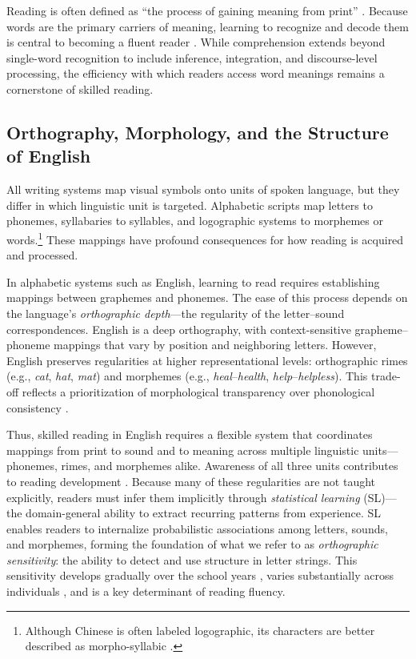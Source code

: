 \documentclass[preprint,12pt, authoryear, review]{elsarticle}
\begin{document}
Reading is often defined as “the process of gaining meaning from print” \citep[][p.~34]{raynerHowPsychologicalScience2001}. Because words are the primary carriers of meaning, learning to recognize and decode them is central to becoming a fluent reader \citep[e.g.,][]{castlesEndingReadingWars2018}. While comprehension extends beyond single-word recognition to include inference, integration, and discourse-level processing, the efficiency with which readers access word meanings remains a cornerstone of skilled reading.

\subsection{Orthography, Morphology, and the Structure of English}

All writing systems map visual symbols onto units of spoken language, but they differ in which linguistic unit is targeted. Alphabetic scripts map letters to phonemes, syllabaries to syllables, and logographic systems to morphemes or words.\footnote{Although Chinese is often labeled logographic, its characters are better described as morpho-syllabic \citep{raynerHowPsychologicalScience2001}.} These mappings have profound consequences for how reading is acquired and processed. 

In alphabetic systems such as English, learning to read requires establishing mappings between graphemes and phonemes. The ease of this process depends on the language’s \textit{orthographic depth}—the regularity of the letter–sound correspondences. English is a deep orthography, with context-sensitive grapheme–phoneme mappings that vary by position and neighboring letters. However, English preserves regularities at higher representational levels: orthographic rimes (e.g., \textit{cat}, \textit{hat}, \textit{mat}) and morphemes (e.g., \textit{heal}–\textit{health}, \textit{help}–\textit{helpless}). This trade-off reflects a prioritization of morphological transparency over phonological consistency \citep{zieglerReadingAcquisitionDevelopmental2005, rastlePlaceMorphologyLearning2019}. 

Thus, skilled reading in English requires a flexible system that coordinates mappings from print to sound and to meaning across multiple linguistic units—phonemes, rimes, and morphemes alike. Awareness of all three units contributes to reading development \citep{mahonyReadingAbilitySensitivity2000}. Because many of these regularities are not taught explicitly, readers must infer them implicitly through \textit{statistical learning} (SL)—the domain-general ability to extract recurring patterns from experience. SL enables readers to internalize probabilistic associations among letters, sounds, and morphemes, forming the foundation of what we refer to as \textit{orthographic sensitivity}: the ability to detect and use structure in letter strings. This sensitivity develops gradually over the school years \citep{treimanSpellingStatisticalLearning2006}, varies substantially across individuals \citep{arciuliStatisticalLearningRelated2012}, and is a key determinant of reading fluency.
\end{document}
